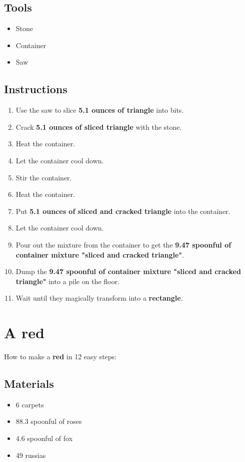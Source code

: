 \documentclass{article}
\begin{document}
\subsection{Tools}\begin{itemize}
\item 
Stone
\item 
Container
\item 
Saw
\end{itemize}
\subsection{Instructions}\begin{enumerate}
\item 
Use the saw to slice \textbf{5.1 ounces of triangle} into bits.
\item 
Crack \textbf{5.1 ounces of sliced triangle} with the stone.
\item 
Heat the container.
\item 
Let the container cool down.
\item 
Stir the container.
\item 
Heat the container.
\item 
Put \textbf{5.1 ounces of sliced and cracked triangle} into the container.
\item 
Let the container cool down.
\item 
Pour out the mixture from the container to get the \textbf{9.47 spoonful of container mixture "sliced and cracked triangle"}.
\item 
Dump the \textbf{9.47 spoonful of container mixture "sliced and cracked triangle"} into a pile on the floor.
\item 
Wait until they magically transform into a \textbf{rectangle}.
\end{enumerate}
\newpage
\section{A red}How to make a \textbf{red} in 12 easy steps:

\subsection{Materials}\begin{itemize}
\item 
6 carpets
\item 
88.3 spoonful of roses
\item 
4.6 spoonful of fox
\item 
49 russias
\end{itemize}
\end{document}
